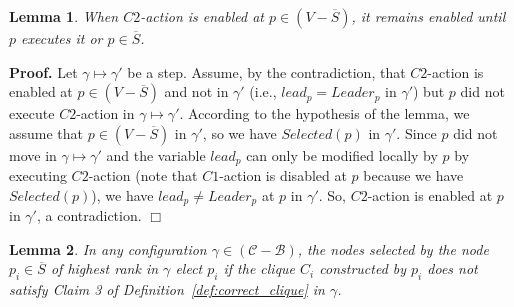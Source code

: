 \documentclass[11pt,letterpaper,onecolumn]{article}
\newtheorem{lemma}{Lemma}
\newenvironment{proof}{\noindent \begin{rm}{\textbf{Proof.} }}{\hspace*{\fill}$\Box$\par\end{rm} \vspace{.3cm}}
\begin{document}
\begin{lemma}
\label{lem:C2-action}
When $C2$-action is enabled at $p \in (V-\overline{S})$, it remains enabled until $p$ executes it or $p \in \overline{S}$.
\end{lemma}

\begin{proof}
Let $\gamma \mapsto \gamma'$ be a step. Assume, by the contradiction, that $C2$-action is enabled at $p \in (V-\overline{S})$ and not in $\gamma'$ (i.e., $lead_p=Leader_p$ in $\gamma'$) but $p$ did not execute $C2$-action in $\gamma \mapsto \gamma'$. According to the hypothesis of the lemma, we assume that $p \in (V-\overline{S})$ in $\gamma'$, so we have $Selected(p)$ in $\gamma'$. Since $p$ did not move in $\gamma \mapsto \gamma'$ and the variable $lead_p$ can only be modified locally by $p$ by executing $C2$-action (note that $C1$-action is disabled at $p$ because we have $Selected(p)$), we have $lead_p \neq Leader_p$ at $p$ in $\gamma'$. So, $C2$-action is enabled at $p$ in $\gamma'$, a contradiction.
\end{proof}

\begin{lemma}
\label{lem:elect_clique}
In any configuration $\gamma \in (\mathcal{C}-\mathcal{B})$, the nodes selected by the node $p_i \in \overline{S}$ of highest rank in $\gamma$ elect $p_i$ if the clique $C_i$ constructed by $p_i$ does not satisfy Claim 3 of Definition~\ref{def:correct_clique} in $\gamma$.
\end{lemma}
\end{document}
